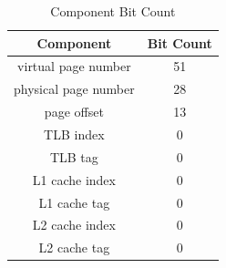 \documentclass[main.tex]{subfiles}
\begin{document}
\begin{enumerate}
    \begin{table}
    \centering
    \begin{tabular}{| c c |}
        \hline
        Component & Bit Count \\  
        \hline\hline
        virtual page number & 51\\
        \hline
        physical page number & 28 \\  
        \hline
        page offset & 13\\
        \hline
        TLB index & 0\\
        \hline
        TLB tag & 0\\
        \hline
        L1 cache index & 0\\
        \hline
        L1 cache tag & 0\\
        \hline
        L2 cache index & 0\\
        \hline
        L2 cache tag & 0\\
        \hline
    \end{tabular}
    \caption{Component Bit Count}
    \label{table:03_component_bit_count}
    \end{table}
\end{enumerate}
\end{document}
